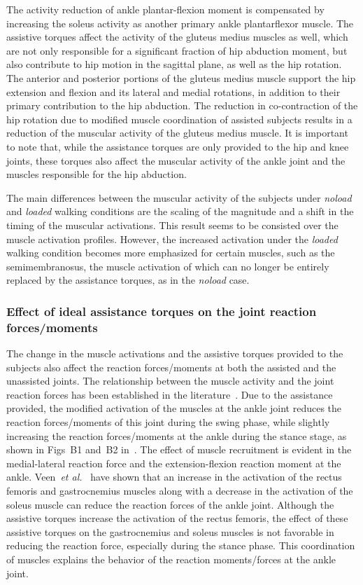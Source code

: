 \documentclass[10pt,letterpaper]{article}
\newcommand{\etal}{\textit{et al.}}
\begin{document}
The activity reduction of ankle plantar-flexion moment is compensated by increasing the soleus activity as another primary ankle plantarflexor muscle. The assistive torques affect the activity of the gluteus medius muscles as well, which are not only responsible for a significant fraction of hip abduction moment, but also contribute to hip motion in the sagittal plane, as well as the hip rotation. The anterior and posterior portions of the gluteus medius muscle support the hip extension and flexion and its lateral and medial rotations, in addition to their primary contribution to the hip abduction. The reduction in co-contraction of the hip rotation due to modified muscle coordination of assisted subjects results in a reduction of the muscular activity of the gluteus medius muscle. It is important to note that, while the assistance torques are only provided to the hip and knee joints, these torques also affect the muscular activity of the ankle joint and the muscles responsible for the hip abduction.

The main differences between the muscular activity of the subjects under \emph{noload} and \emph{loaded} walking conditions are the scaling of the magnitude and a shift in the timing of the muscular activations. This result seems to be consisted over the muscle activation profiles. However, the increased activation under the \emph{loaded} walking condition becomes more emphasized for certain muscles, such as the semimembranosus, the muscle activation of which can no longer be entirely replaced by the assistance torques, as in the \emph{noload} case.


\subsubsection*{Effect of ideal assistance torques on the joint reaction forces/moments}

The change in the muscle activations and the assistive torques provided to the subjects also affect the reaction forces/moments at both the assisted and the unassisted joints. The relationship between the muscle activity and the joint reaction forces has been established in the literature~\cite{DeMers2014,VanVeen2019}. Due to the assistance provided, the modified activation of the muscles at the ankle joint reduces the reaction forces/moments of this joint during the swing phase, while slightly increasing the reaction forces/moments at the ankle  during the stance stage, as shown in Figs~B1 and~B2 in~. The effect of muscle recruitment is evident in the medial-lateral reaction force and the extension-flexion reaction moment at the ankle. Veen~\etal~\cite{VanVeen2019} have shown that an increase in the activation of the rectus femoris and gastrocnemius muscles along with a decrease in the activation of the soleus muscle can reduce the reaction forces of the ankle joint. Although the assistive torques increase the activation of the rectus femoris, the effect of these assistive torques on the gastrocnemius and soleus muscles is not favorable in reducing the reaction force, especially during the stance phase. This coordination of muscles explains the behavior of the reaction moments/forces at the ankle joint.
\end{document}
